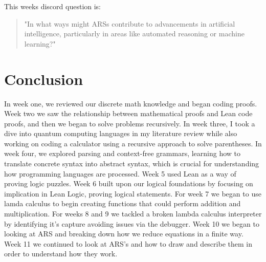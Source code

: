 \documentclass{article}
\begin{document}
This weeks discord question is:

\begin{quote}
\small
 "In what ways might ARSs contribute to advancements in artificial intelligence, particularly in areas like automated reasoning or machine learning?"
\end{quote}
    
\section*{Conclusion}
In week one, we reviewed our discrete math knowledge and began coding proofs. Week two we saw the relationship between mathematical proofs and Lean code proofs, and then we began to solve problems recursively. In week three, I took a dive into quantum computing languages in my literature review while also working on coding a calculator using a recursive approach to solve parentheses. In week four, we explored parsing and context-free grammars, learning how to translate concrete syntax into abstract syntax, which is crucial for understanding how programming languages are processed. Week 5 used Lean as a way of proving logic puzzles. Week 6 built upon our logical foundations by focusing on implication in Lean Logic, proving logical statements. For week 7 we began to use lamda calculus to begin creating functions that could perform addition and multiplication. For weeks 8 and 9 we tackled a broken lambda calculus interpreter by identifying it's capture avoiding issues via the debugger. Week 10 we began to looking at ARS and breaking down how we reduce equations in a finite way. Week 11 we continued to look at ARS's and how to draw and describe them in order to understand how they work. 
\end{document}
